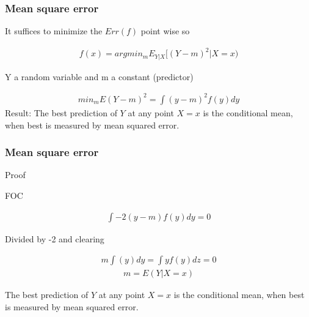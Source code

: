 \documentclass[
  shownotes,
  xcolor={svgnames},
  hyperref={colorlinks,citecolor=DarkBlue,linkcolor=DarkRed,urlcolor=DarkBlue}
  ]{beamer}
\begin{document}
\begin{frame}
\frametitle{Mean square error}

It suffices to minimize  the $Err(f)$ point wise so

\begin{align}
f(x)= argmin_m E_{Y|X} [(Y-m)^2|X=x)
\end{align}

Y a random variable and m a constant (predictor)

\begin{align}
min_m E(Y-m)^2= \int (y-m)^2  f(y)dy
\end{align}
Result: The best prediction of $Y$ at any point $X = x$ is the conditional mean, when best is measured by mean squared error.

\end{frame}

\begin{frame}
\frametitle{Mean square error}
Proof

FOC

\begin{align}
\int -2 (y-m)  f(y)  dy =0
\end{align}

Divided by -2 and clearing

\begin{align}
 m \int (y) dy = \int y f(y)  dz =0
\end{align}
\begin{align}
m=E(Y|X=x)
\end{align}


The best prediction of $Y$ at any point $X = x$ is the conditional mean, when best is measured by mean squared error.
\end{frame}
\end{document}
